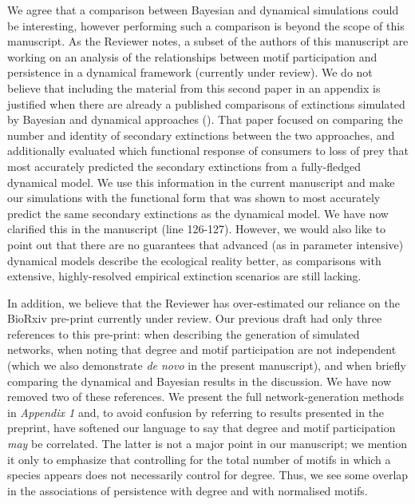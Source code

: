 \documentclass[12pt]{article}
\newcommand{\us}{\rm \setlength{\leftskip}{0.3cm} \setlength{\rightskip}{0.3cm}}
\begin{document}
        \us We agree that a comparison between Bayesian and dynamical simulations could be interesting, however performing such a comparison is beyond the scope of this manuscript. As the Reviewer notes, a subset of the authors of this manuscript are working on an analysis of the relationships between motif participation and persistence in a dynamical framework (currently under review). We do not believe that including the material from this second paper in an appendix is justified when there are already a published comparisons of extinctions simulated by Bayesian and dynamical approaches (\citealp[]{Eklof2013a}). That paper focused on comparing the number and identity of secondary extinctions between the two approaches, and additionally evaluated which functional response of consumers to loss of prey that most accurately predicted the secondary extinctions from a fully-fledged dynamical model. We use this information in the current manuscript and make our simulations with the functional form that was shown to most accurately predict the same secondary extinctions as the dynamical model. We have now clarified this in the manuscript (line 126-127). However, we would also like to point out that there are no guarantees that advanced (as in parameter intensive) dynamical models describe the ecological reality better, as comparisons with extensive, highly-resolved empirical extinction scenarios are still lacking.     
        
        
        In addition, we believe that the Reviewer has over-estimated our reliance on the BioRxiv pre-print currently under review. Our previous draft had only three references to this pre-print: when describing the generation of simulated networks, when noting that degree and motif participation are not independent (which we also demonstrate \emph{de novo} in the present manuscript), and when briefly comparing the dynamical and Bayesian results in the discussion.
        We have now removed two of these references.
        We present the full network-generation methods in \emph{Appendix 1} and, to avoid confusion by referring to results presented in the preprint, have softened our language to say that degree and motif participation \emph{may} be correlated. 
        The latter is not a major point in our manuscript; we mention it only to emphasize that controlling for the total number of motifs in which a species appears does not necessarily control for degree. 
        Thus, we see some overlap in the associations of persistence with degree and with normalised motifs.
        
\end{document}
